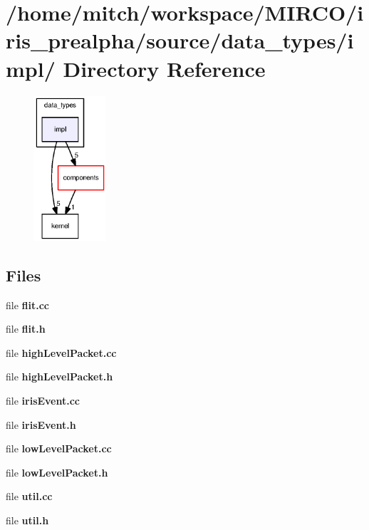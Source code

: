 \section{/home/mitch/workspace/MIRCO/iris\_\-prealpha/source/data\_\-types/impl/ Directory Reference}
\label{dir_6fccd0513f2150ad645344613a5a6dbe}


\nopagebreak
\begin{figure}[H]
\begin{center}
\leavevmode
\includegraphics[width=76pt]{dir_6fccd0513f2150ad645344613a5a6dbe_dep}
\end{center}
\end{figure}
\subsection*{Files}
\begin{CompactItemize}
\item 
file {\bf flit.cc}
\item 
file {\bf flit.h}
\item 
file {\bf highLevelPacket.cc}
\item 
file {\bf highLevelPacket.h}
\item 
file {\bf irisEvent.cc}
\item 
file {\bf irisEvent.h}
\item 
file {\bf lowLevelPacket.cc}
\item 
file {\bf lowLevelPacket.h}
\item 
file {\bf util.cc}
\item 
file {\bf util.h}
\end{CompactItemize}
